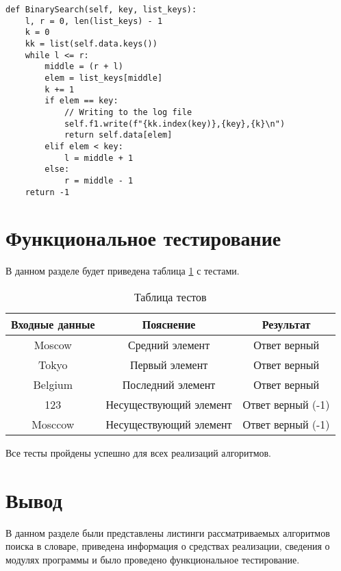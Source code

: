 \begin{center}
	\captionsetup{justification=raggedright,singlelinecheck=off}
\begin{lstlisting}[label=lst:bs,caption=Реализация алгоритма бинарного поиска]
def BinarySearch(self, key, list_keys):
	l, r = 0, len(list_keys) - 1
	k = 0
	kk = list(self.data.keys())
	while l <= r:
		middle = (r + l) 
		elem = list_keys[middle]
		k += 1
		if elem == key:
			// Writing to the log file 
			self.f1.write(f"{kk.index(key)},{key},{k}\n")
			return self.data[elem]
		elif elem < key:
			l = middle + 1
		else:
			r = middle - 1
	return -1
\end{lstlisting}
\end{center}

\section{Функциональное тестирование}

В данном разделе будет приведена таблица \ref{table:ref1} с тестами.
\begin{center}
	\captionsetup{justification=raggedleft,singlelinecheck=off}
\begin{table}[ht]
	\centering
	\caption{Таблица тестов}
	\label{table:ref1}
	\begin{tabular}{ |c|c|c|}
		\hline
		Входные данные    & Пояснение   	  & Результат    \\ \hline
		\hline
		Moscow			  & Средний элемент   & Ответ верный \\ \hline
		Tokyo 			  & Первый элемент    & Ответ верный \\ \hline
		Belgium 		  & Последний элемент & Ответ верный \\ \hline
		123 & Несуществующий элемент & Ответ верный (-1) \\ \hline
		Mosccow & Несуществующий элемент & Ответ верный (-1) \\ \hline
	\end{tabular}
\end{table}
\end{center}
Все тесты пройдены успешно для всех реализаций алгоритмов.


\section{Вывод}
В данном разделе были представлены листинги рассматриваемых алгоритмов поиска в словаре, приведена информация о средствах реализации, сведения о модулях программы и было проведено функциональное тестирование.